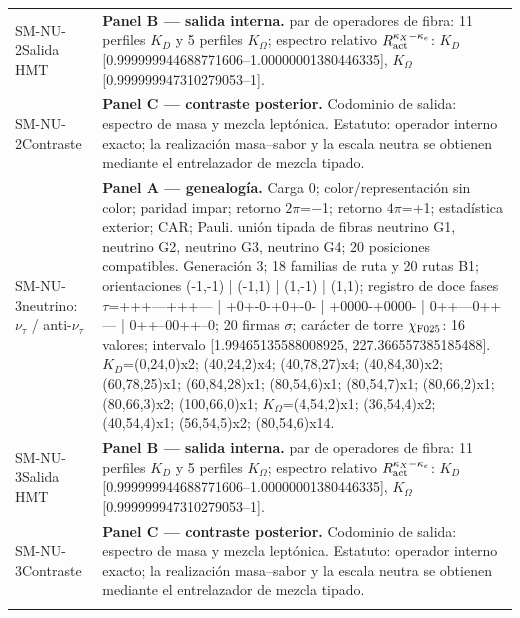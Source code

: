 \begin{longtable}{@{}>{\raggedright\arraybackslash}p{2.55cm}>{\raggedright\arraybackslash}p{11.75cm}@{}}
SM-NU-2\newline Salida HMT & \textbf{Panel B --- salida interna. }par de operadores de fibra: 11 perfiles \(K_D\) y 5 perfiles \(K_{\Omega}\); espectro relativo \(R_{\rm act}^{\kappa_X-\kappa_e}\): \(K_D\) [0.999999944688771606--1.00000001380446335], \(K_{\Omega}\) [0.999999947310279053--1]. \\
SM-NU-2\newline Contraste & \textbf{Panel C --- contraste posterior. }Codominio de salida: espectro de masa y mezcla leptónica. Estatuto: operador interno exacto; la realización masa--sabor y la escala neutra se obtienen mediante el entrelazador de mezcla tipado. \\\addlinespace[2pt]
SM-NU-3\newline neutrino: \(\nu_\tau\) / anti-\(\nu_\tau\) & \textbf{Panel A --- genealogía. }Carga 0; color/representación sin color; paridad impar; retorno \(2\pi\)=\(-\)1; retorno \(4\pi\)=+1; estadística exterior; CAR; Pauli. unión tipada de fibras neutrino G1, neutrino G2, neutrino G3, neutrino G4; 20 posiciones compatibles. Generación 3; 18 familias de ruta y 20 rutas B1; orientaciones (-1,-1) | (-1,1) | (1,-1) | (1,1); registro de doce fases \(\tau\)=+++---+++--- | +0+-0-+0+-0- | +0000-+0000- | 0++---0++--- | 0++--00++--0; 20 firmas \(\sigma\); carácter de torre \(\chi_{\rm F025}\): 16 valores; intervalo [1.99465135588008925, 227.366557385185488]. \(K_D\)=(0,24,0)x2; (40,24,2)x4; (40,78,27)x4; (40,84,30)x2; (60,78,25)x1; (60,84,28)x1; (80,54,6)x1; (80,54,7)x1; (80,66,2)x1; (80,66,3)x2; (100,66,0)x1; \(K_{\Omega}\)=(4,54,2)x1; (36,54,4)x2; (40,54,4)x1; (56,54,5)x2; (80,54,6)x14. \\
SM-NU-3\newline Salida HMT & \textbf{Panel B --- salida interna. }par de operadores de fibra: 11 perfiles \(K_D\) y 5 perfiles \(K_{\Omega}\); espectro relativo \(R_{\rm act}^{\kappa_X-\kappa_e}\): \(K_D\) [0.999999944688771606--1.00000001380446335], \(K_{\Omega}\) [0.999999947310279053--1]. \\
SM-NU-3\newline Contraste & \textbf{Panel C --- contraste posterior. }Codominio de salida: espectro de masa y mezcla leptónica. Estatuto: operador interno exacto; la realización masa--sabor y la escala neutra se obtienen mediante el entrelazador de mezcla tipado. \\\addlinespace[2pt]

\end{longtable}
